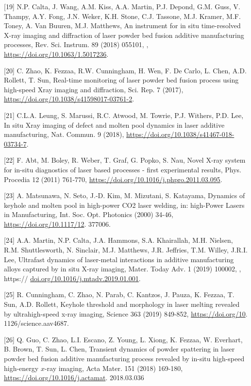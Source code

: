 \documentclass[10pt]{article}
\begin{document}
[19] N.P. Calta, J. Wang, A.M. Kiss, A.A. Martin, P.J. Depond, G.M. Guss, V. Thampy, A.Y. Fong, J.N. Weker, K.H. Stone, C.J. Tassone, M.J. Kramer, M.F. Toney, A. Van Buuren, M.J. Matthews, An instrument for in situ time-resolved X-ray imaging and diffraction of laser powder bed fusion additive manufacturing processes, Rev. Sci. Instrum. 89 (2018) 055101, , \href{https://doi.org/10.1063/1.5017236}{https://doi.org/10.1063/1.5017236}.

[20] C. Zhao, K. Fezzaa, R.W. Cunningham, H. Wen, F. De Carlo, L. Chen, A.D. Rollett, T. Sun, Real-time monitoring of laser powder bed fusion process using high-speed Xray imaging and diffraction, Sci. Rep. 7 (2017), \href{https://doi.org/10.1038/s41598017-03761-2}{https://doi.org/10.1038/s41598017-03761-2}.

[21] C.L.A. Leung, S. Marussi, R.C. Atwood, M. Towrie, P.J. Withers, P.D. Lee, In situ Xray imaging of defect and molten pool dynamics in laser additive manufacturing, Nat. Commun. 9 (2018), \href{https://doi.org/10.1038/s41467-018-03734-7}{https://doi.org/10.1038/s41467-018-03734-7}.

[22] F. Abt, M. Boley, R. Weber, T. Graf, G. Popko, S. Nau, Novel X-ray system for in-situ diagnostics of laser based processes - first experimental results, Phys. Procedia 12 (2011) 761-770, \href{https://doi.org/10.1016/j.phpro.2011.03.095}{https://doi.org/10.1016/j.phpro.2011.03.095}.

[23] A. Matsunawa, N. Seto, J.-D. Kim, M. Mizutani, S. Katayama, Dynamics of keyhole and molten pool in high-power CO2 laser welding, in: high-Power Lasers in Manufacturing, Int. Soc. Opt. Photonics (2000) 34-46, \href{https://doi.org/10.1117/12}{https://doi.org/10.1117/12}. 377006.

[24] A.A. Martin, N.P. Calta, J.A. Hammons, S.A. Khairallah, M.H. Nielsen, R.M. Shuttlesworth, N. Sinclair, M.J. Matthews, J.R. Jeffries, T.M. Willey, J.R.I. Lee, Ultrafast dynamics of laser-metal interactions in additive manufacturing alloys captured by in situ X-ray imaging, Mater. Today Adv. 1 (2019) 100002, , https:// \href{http://doi.org/10.1016/j.mtadv.2019.01.001}{doi.org/10.1016/j.mtadv.2019.01.001}.

[25] R. Cunningham, C. Zhao, N. Parab, C. Kantzos, J. Pauza, K. Fezzaa, T. Sun, A.D. Rollett, Keyhole threshold and morphology in laser melting revealed by ultrahigh-speed x-ray imaging, Science 363 (2019) 849-852, \href{https://doi.org/10}{https://doi.org/10}. 1126/science.aav4687.

[26] Q. Guo, C. Zhao, L.I. Escano, Z. Young, L. Xiong, K. Fezzaa, W. Everhart, B. Brown, T. Sun, L. Chen, Transient dynamics of powder spattering in laser powder bed fusion additive manufacturing process revealed by in-situ high-speed high-energy $x$-ray imaging, Acta Mater. 151 (2018) 169-180, \href{https://doi.org/10.1016/j.actamat}{https://doi.org/10.1016/j.actamat}. 2018.03.036
\end{document}
